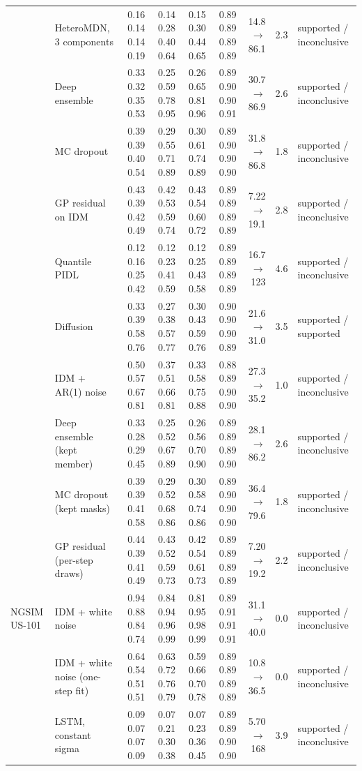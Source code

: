 \begin{longtable}{llrrrrrrl}
 & HeteroMDN, 3 components & 0.16 0.14 0.14 0.19 & 0.14 0.28 0.40 0.64 & 0.15 0.30 0.44 0.65 & 0.89 0.89 0.89 0.89 & 14.8 $\rightarrow$ 86.1 & 2.3 & supported / inconclusive \\
 & Deep ensemble & 0.33 0.32 0.35 0.53 & 0.25 0.59 0.78 0.95 & 0.26 0.65 0.81 0.96 & 0.89 0.90 0.90 0.91 & 30.7 $\rightarrow$ 86.9 & 2.6 & supported / inconclusive \\
 & MC dropout & 0.39 0.39 0.40 0.54 & 0.29 0.55 0.71 0.89 & 0.30 0.61 0.74 0.89 & 0.89 0.90 0.90 0.90 & 31.8 $\rightarrow$ 86.8 & 1.8 & supported / inconclusive \\
 & GP residual on IDM & 0.43 0.39 0.42 0.49 & 0.42 0.53 0.59 0.74 & 0.43 0.54 0.60 0.72 & 0.89 0.89 0.89 0.89 & 7.22 $\rightarrow$ 19.1 & 2.8 & supported / inconclusive \\
 & Quantile PIDL & 0.12 0.16 0.25 0.42 & 0.12 0.23 0.41 0.59 & 0.12 0.25 0.43 0.58 & 0.89 0.89 0.89 0.89 & 16.7 $\rightarrow$ 123 & 4.6 & supported / inconclusive \\
 & Diffusion & 0.33 0.39 0.58 0.76 & 0.27 0.38 0.57 0.77 & 0.30 0.43 0.59 0.76 & 0.90 0.90 0.90 0.89 & 21.6 $\rightarrow$ 31.0 & 3.5 & supported / supported \\
 & IDM + AR(1) noise & 0.50 0.57 0.67 0.81 & 0.37 0.51 0.66 0.81 & 0.33 0.58 0.75 0.88 & 0.88 0.89 0.90 0.90 & 27.3 $\rightarrow$ 35.2 & 1.0 & supported / inconclusive \\
 & Deep ensemble (kept member) & 0.33 0.28 0.29 0.45 & 0.25 0.52 0.67 0.89 & 0.26 0.56 0.70 0.90 & 0.89 0.89 0.89 0.90 & 28.1 $\rightarrow$ 86.2 & 2.6 & supported / inconclusive \\
 & MC dropout (kept masks) & 0.39 0.39 0.41 0.58 & 0.29 0.52 0.68 0.86 & 0.30 0.58 0.74 0.86 & 0.89 0.90 0.90 0.90 & 36.4 $\rightarrow$ 79.6 & 1.8 & supported / inconclusive \\
 & GP residual (per-step draws) & 0.44 0.39 0.41 0.49 & 0.43 0.52 0.59 0.73 & 0.42 0.54 0.61 0.73 & 0.89 0.89 0.89 0.89 & 7.20 $\rightarrow$ 19.2 & 2.2 & supported / inconclusive \\
\midrule
NGSIM US-101 & IDM + white noise & 0.94 0.88 0.84 0.74 & 0.84 0.94 0.96 0.99 & 0.81 0.95 0.98 0.99 & 0.89 0.91 0.91 0.91 & 31.1 $\rightarrow$ 40.0 & 0.0 & supported / inconclusive \\
 & IDM + white noise (one-step fit) & 0.64 0.54 0.51 0.51 & 0.63 0.72 0.76 0.79 & 0.59 0.66 0.70 0.78 & 0.89 0.89 0.89 0.89 & 10.8 $\rightarrow$ 36.5 & 0.0 & supported / inconclusive \\
 & LSTM, constant sigma & 0.09 0.07 0.07 0.09 & 0.07 0.21 0.30 0.38 & 0.07 0.23 0.36 0.45 & 0.89 0.89 0.90 0.90 & 5.70 $\rightarrow$ 168 & 3.9 & supported / inconclusive \\

\end{longtable}
